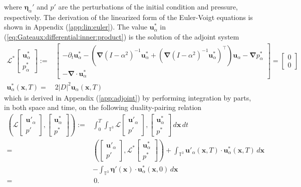 \documentclass[12pt]{article}
\def\x{\boldsymbol x}
\def\ua{\boldsymbol u_\alpha}
\def\upa{\boldsymbol u'_\alpha}
\def\usa{\boldsymbol u^*_\alpha}
\def\bn{\boldsymbol \nabla}
\def\be{\boldsymbol \eta}
\def\bea{\boldsymbol \eta_\alpha}
\def\TT{\mathbb{T}}
\def\L{\mathcal{L}}
\numberwithin{equation}{section}
\begin{document}
where $\bea'$ and $p'$ are the perturbations of the initial condition and pressure, respectively. The derivation of the linearized form of the Euler-Voigt equations is shown in Appendix (\ref{app:lin:euler}). The value $\usa$ in (\ref{eq:Gateaux:differential:inner:product}) is the solution of the adjoint system
\small
\begin{subequations}\label{eq:Euler-Voigt:adjoint}
\begin{align}
\L^*\begin{bmatrix}
\usa\\
p_{\alpha}^*
\end{bmatrix} :=& \begin{bmatrix}
-\partial_t\usa-(\bn (I-\alpha^2)^{-1}\usa + (\bn (I-\alpha^2)^{-1}\usa)^{\intercal})\ua-\bn p_{\alpha}^*\\
-\bn \cdot \usa
\end{bmatrix} = \begin{bmatrix}
0\\
0
\end{bmatrix}\\
\usa(\x,T) =& 2|D|^2\ua(\x,T)
\end{align}
\end{subequations}
\normalsize
which is derived in Appendix (\ref{app:adjoint}) by performing integration by parts, in both space and time, on the following duality-pairing relation 
\begin{equation}\label{eq:duality:pairing}
\begin{aligned}
\left(\L\begin{bmatrix}
\upa\\
p'
\end{bmatrix}, \begin{bmatrix}
\usa\\
p^*
\end{bmatrix} \right) :=& \int_0^T\int_{\TT^3} \L\begin{bmatrix}
\upa\\
p'
\end{bmatrix}, \begin{bmatrix}
\usa\\
p^*
\end{bmatrix} \,d\x\,dt \\[3pt]
=& \left( \begin{bmatrix}
\upa\\
p'
\end{bmatrix},\L^*\begin{bmatrix}
\usa\\
p^*
\end{bmatrix} \right) + \int_{\TT^3} \upa(\x,T)\cdot \usa(\x,T)\,d\x \\[3pt]
&- \int_{\TT^3}\be'(\x)\cdot \usa(\x,0) \,d\x \\
=& \, 0.
\end{aligned}
\end{equation}
\end{document}
